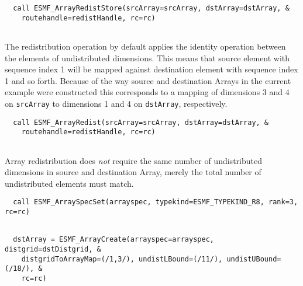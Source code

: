  \begin{verbatim}
  call ESMF_ArrayRedistStore(srcArray=srcArray, dstArray=dstArray, &
    routehandle=redistHandle, rc=rc)
 
\end{verbatim}
 
 

   The redistribution operation by default applies the identity operation between
   the elements of undistributed dimensions. This means that source element with
   sequence index 1 will be mapped against destination element with sequence
   index 1 and so forth. Because of the way source and destination Arrays
   in the current example were constructed this corresponds to a mapping of
   dimensions 3 and 4 on {\tt srcArray} to dimensions 1 and 4 on {\tt dstArray},
   respectively. 

 \begin{verbatim}
  call ESMF_ArrayRedist(srcArray=srcArray, dstArray=dstArray, &
    routehandle=redistHandle, rc=rc)
 
\end{verbatim}
 

   Array redistribution does {\em not} require the same number of undistributed
   dimensions in source and destination Array, merely the total number of
   undistributed elements must match. 

 \begin{verbatim}
  call ESMF_ArraySpecSet(arrayspec, typekind=ESMF_TYPEKIND_R8, rank=3, rc=rc)
 
\end{verbatim}
 

 \begin{verbatim}
  dstArray = ESMF_ArrayCreate(arrayspec=arrayspec, distgrid=dstDistgrid, &
    distgridToArrayMap=(/1,3/), undistLBound=(/11/), undistUBound=(/18/), &
    rc=rc)
 
\end{verbatim}
 

